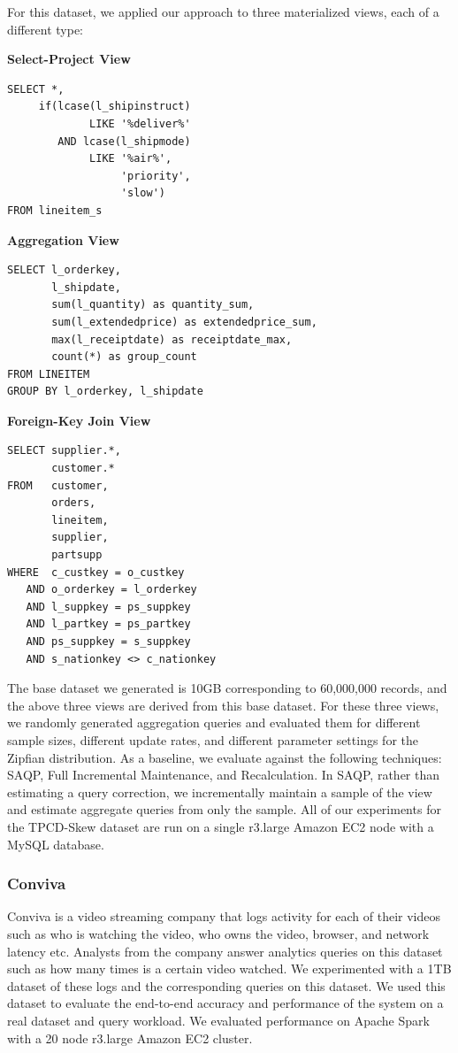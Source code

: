 For this dataset, we applied our approach to three materialized views, each of a different type:
\vspace{1em}

\textbf{Select-Project View}
\begin{lstlisting}
SELECT *, 
     if(lcase(l_shipinstruct) 
     	     LIKE '%deliver%' 
        AND lcase(l_shipmode) 
             LIKE '%air%',
                  'priority',
                  'slow') 
FROM lineitem_s
\end{lstlisting}

\vspace{1em}

\textbf{Aggregation View}
\begin{lstlisting}
SELECT l_orderkey, 
       l_shipdate, 
       sum(l_quantity) as quantity_sum, 
       sum(l_extendedprice) as extendedprice_sum, 
       max(l_receiptdate) as receiptdate_max, 
       count(*) as group_count 
FROM LINEITEM 
GROUP BY l_orderkey, l_shipdate
\end{lstlisting}

\vspace{1em}

\textbf{Foreign-Key Join View}
\begin{lstlisting}
SELECT supplier.*, 
	   customer.* 
FROM   customer, 
       orders, 
       lineitem, 
       supplier, 
       partsupp 
WHERE  c_custkey = o_custkey 
   AND o_orderkey = l_orderkey 
   AND l_suppkey = ps_suppkey 
   AND l_partkey = ps_partkey 
   AND ps_suppkey = s_suppkey 
   AND s_nationkey <> c_nationkey
\end{lstlisting}

\vspace{1em}

The base dataset we generated is 10GB corresponding to 60,000,000 records, and the above three views are derived from this base dataset.
For these three views, we randomly generated aggregation queries and evaluated them for different sample sizes, different update rates, and different parameter settings for the Zipfian distribution.
As a baseline, we evaluate against the following techniques: SAQP, Full Incremental Maintenance, and Recalculation.
In SAQP, rather than estimating a query correction, we incrementally maintain a sample of the view and estimate aggregate queries from only the sample.
All of our experiments for the TPCD-Skew dataset are run on a single r3.large Amazon EC2 node with a MySQL database.

\subsubsection{Conviva}
Conviva is a video streaming company that logs activity for each of their videos such as who is watching the video, who owns the video, browser, and network latency etc. 
Analysts from the company answer analytics queries on this dataset such as how many times is a certain video watched.
We experimented with a 1TB dataset of these logs and the corresponding queries on this dataset.
We used this dataset to evaluate the end-to-end accuracy and performance of the system on a real dataset and query workload.
We evaluated performance on Apache Spark with a 20 node r3.large Amazon EC2 cluster. 

